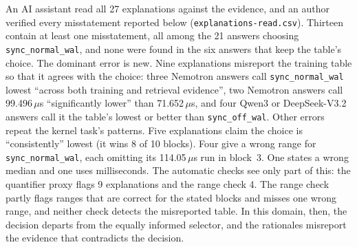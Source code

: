 An AI assistant read all 27 explanations against the evidence, and an author verified every misstatement reported below (\texttt{explanations-read.csv}). Thirteen contain at least one misstatement, all among the 21 answers choosing \texttt{sync\_normal\_wal}, and none were found in the six answers that keep the table's choice. The dominant error is new. Nine explanations misreport the training table so that it agrees with the choice: three Nemotron answers call \texttt{sync\_normal\_wal} lowest ``across both training and retrieval evidence'', two Nemotron answers call 99.496\,$\mu$s ``significantly lower'' than 71.652\,$\mu$s, and four Qwen3 or DeepSeek-V3.2 answers call it the table's lowest or better than \texttt{sync\_off\_wal}. Other errors repeat the kernel task's patterns. Five explanations claim the choice is ``consistently'' lowest (it wins 8 of 10 blocks). Four give a wrong range for \texttt{sync\_normal\_wal}, each omitting its 114.05\,$\mu$s run in block~3. One states a wrong median and one uses milliseconds. The automatic checks see only part of this: the quantifier proxy flags 9 explanations and the range check 4. The range check partly flags ranges that are correct for the stated blocks and misses one wrong range, and neither check detects the misreported table. In this domain, then, the decision departs from the equally informed selector, and the rationales misreport the evidence that contradicts the decision.

